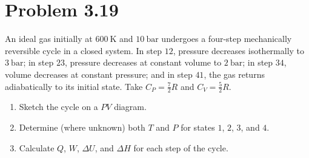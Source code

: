 \documentclass{article}
\begin{document}
\section*{Problem 3.19}
An ideal gas initially at $\SI{600}{\kelvin}$ and $\SI{10}{\bar}$
undergoes a four-step mechanically reversible cycle in a closed
system. In step $12$, pressure decreases isothermally to
$\SI{3}{\bar}$; in step $23$, pressure decreases at constant volume
to $\SI{2}{\bar}$; in step $34$, volume decreases at constant
pressure; and in step $41$, the gas returns adiabatically to its
initial state. Take $C_P = \frac{7}{2}R$ and $C_V = \frac{5}{2}R$.
\begin{enumerate}[label=(\alph*)]
  \item Sketch the cycle on a $PV$ diagram.
  \item Determine (where unknown) both $T$ and $P$ for states $1$, $2$,
    $3$, and $4$.
  \item Calculate $Q$, $W$, $\Delta U$, and $\Delta H$ for each step
    of the cycle.
\end{enumerate}
\end{document}
